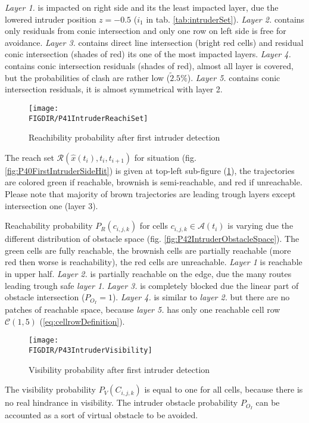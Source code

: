 \emph{Layer 1.} is impacted on right side and its the least impacted layer, due the lowered intruder position $z=-0.5$ ($i_1$ in tab. \ref{tab:intruderSet}). \emph{Layer 2.} contains only residuals from conic intersection and only one row on left side is free for avoidance. \emph{Layer 3.} contains direct line intersection (bright red cells) and residual conic intersection (shades of red) its one of the most impacted layers. \emph{Layer 4.} contains conic intersection residuals (shades of red), almost all layer is covered, but the probabilities of clash are rather low ($\tilde 2.5 \%$). \emph{Layer 5.} contains conic intersection residuals, it is almost symmetrical with layer 2.

\begin{figure}[H]
    \centering
    \texttt{[image: \\FIGDIR/P41IntruderReachiSet]}
    \caption{Reachibility probability after first intruder detection}
    \label{fig:P41IntruderReachiSet}
\end{figure}
The reach set $\mathscr{R}(\hat{x}(t_i),t_i,t_{i+1})$ for situation (fig. \ref{fig:P40FirstIntruderSideHit}) is given at top-left sub-figure  (\ref{fig:P41IntruderReachiSet}), the trajectories are colored green if reachable, brownish is semi-reachable, and red if unreachable. Please note that majority of brown trajectories are leading trough layers except intersection one (layer 3).

Reachability probability $P_R(c_{i,j,k})$ for cells $c_{i,j,k}\in\mathscr{A}(t_i)$ is varying due the different distribution of obstacle space (fig. \ref{fig:P42IntruderObstacleSpace}). The green cells are fully reachable, the brownish cells are partially reachable (more red then worse is reachability), the red cells are unreachable. \emph{Layer 1} is reachable in upper half. \emph{Layer 2.} is partially reachable on the edge, due the many routes leading trough safe \emph{layer 1}. \emph{Layer 3.} is completely blocked due the linear part of obstacle intersection ($P_{O_I}=1$). \emph{Layer 4.} is similar to \emph{layer 2.} but there are no patches of reachable space, because \emph{layer 5.} has only one reachable cell row $\mathscr{C}(1,5)$ (\ref{eq:cellrowDefinition}).


\begin{figure}[H]
    \centering
    \texttt{[image: \\FIGDIR/P43IntruderVisibility]}
    \caption{Visibility probability after first intruder detection}
    \label{fig:P43IntruderVisibility}
\end{figure}
\noindent The visibility probability $P_V(C_{i,j,k})$ is equal to one for all cells, because there is no real hindrance in visibility. The intruder obstacle probability $P_{O_I}$ can be accounted as a sort of virtual obstacle to be avoided. 


